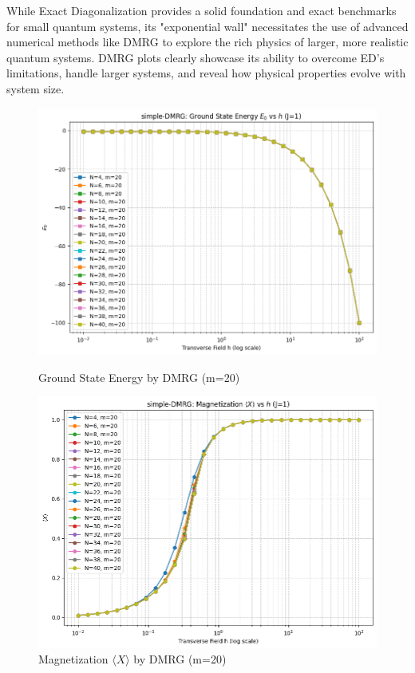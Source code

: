 \documentclass[pre,twocolumn,floatfix]{revtex4-1}
\begin{document}
While Exact Diagonalization provides a solid foundation and exact benchmarks for small quantum systems, its "exponential wall" necessitates the use of advanced numerical methods like DMRG to explore the rich physics of larger, more realistic quantum systems. DMRG plots clearly showcase its ability to overcome ED's limitations, handle larger systems, and reveal how physical properties evolve with system size.
\begin{figure}[htbp]
    \centering
    \begin{minipage}{0.48\textwidth}
        \centering
        \includegraphics[width=\linewidth]{images/E_DMRG.png} %
        \caption{Ground State Energy by DMRG (m=20)}
        \label{dmrg_a}
    \end{minipage}\hfill %
    \begin{minipage}{0.48\textwidth}
        \centering
        \includegraphics[width=\linewidth]{images/mx_DMRG.png} %
        \caption{Magnetization $\langle X \rangle$ by DMRG (m=20)}
        \label{dmrg_b}
    \end{minipage}
\end{figure}
\end{document}
